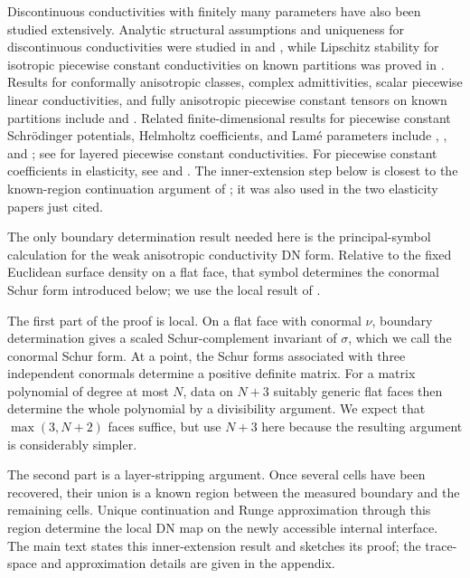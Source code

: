 \documentclass[11pt,oneside]{article}
\begin{document}
Discontinuous conductivities with finitely many parameters have also been
studied extensively.  Analytic structural assumptions and
uniqueness for discontinuous conductivities were studied in
\cite{KohnVogelius1984,KohnVogelius1985} and \cite{Isakov1988}, while Lipschitz stability
for isotropic piecewise constant conductivities on known partitions was proved
in \cite{AlessandriniVessella2005}.  Results for conformally anisotropic
classes, complex admittivities, scalar piecewise linear conductivities, and
fully anisotropic piecewise constant tensors on known partitions include
\cite{BerettaFrancini2011,GaburroSincich2015} and
\cite{AlessandriniDeHoopGaburroSincich2016,AlessandriniDeHoopGaburro2017}.
Related finite-dimensional results for piecewise constant Schr\"odinger
potentials, Helmholtz coefficients, and Lam\'e parameters include
\cite{BerettaDeHoopQiu2012}, \cite{BerettaDeHoopQiuScherzer2014}, and
\cite{BerettaFranciniVessella2013};
see \cite{Garde2020} for layered piecewise constant conductivities.  For
piecewise constant coefficients in elasticity, see
\cite{CarsteaHondaNakamura2018} and \cite{CarsteaNakamuraOksanen2019}.
The inner-extension step below is closest to the known-region continuation
argument of \cite{Ikehata2002}; it was also used in the two elasticity papers
just cited.

The only boundary determination result needed here is the principal-symbol
calculation for the weak anisotropic conductivity DN form.  Relative to the
fixed Euclidean surface density on a flat face, that symbol determines the
conormal Schur form introduced below; we use the local result of
\cite{KangYun2003}.


The first part of the proof is local.  On a flat face with conormal \(\nu\),
boundary determination gives a scaled Schur-complement invariant of \(\sigma\),
which we call the conormal Schur form.  At a point, the Schur forms associated
with three independent conormals determine a positive definite matrix.  For a
matrix polynomial of degree at most \(N\), data on \(N+3\) suitably generic
flat faces then determine the whole polynomial by a divisibility argument.  We
expect that \(\max(3,N+2)\) faces suffice, but use \(N+3\) here because the
resulting argument is considerably simpler.

The second part is a layer-stripping argument.  Once several cells have been
recovered, their union is a known region between the measured boundary and the
remaining cells.  Unique continuation and Runge approximation through this
region determine the local DN map on the newly accessible internal interface.
The main text states this inner-extension result and sketches its proof; the
trace-space and approximation details are given in the appendix.
\end{document}
